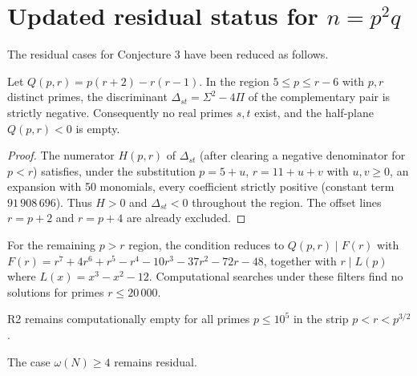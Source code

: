 
\section{Updated residual status for \( n = p^2 q \)}

The residual cases for Conjecture 3 have been reduced as follows.

\begin{theorem}
Let \( Q(p, r) = p(r + 2) - r(r - 1) \). In the region \( 5 \le p \le r - 6 \) with \( p, r \) distinct primes, the discriminant \( \Delta_{st} = \Sigma^2 - 4\Pi \) of the complementary pair is strictly negative. Consequently no real primes \( s, t \) exist, and the half-plane \( Q(p, r) < 0 \) is empty.
\end{theorem}

\begin{proof}
The numerator \( H(p, r) \) of \( \Delta_{st} \) (after clearing a negative denominator for \( p < r \)) satisfies, under the substitution \( p = 5 + u \), \( r = 11 + u + v \) with \( u, v \ge 0 \), an expansion with 50 monomials, every coefficient strictly positive (constant term \( 91\,908\,696 \)). Thus \( H > 0 \) and \( \Delta_{st} < 0 \) throughout the region. The offset lines \( r = p + 2 \) and \( r = p + 4 \) are already excluded.
\end{proof}

For the remaining \( p > r \) region, the condition reduces to \( Q(p, r) \mid F(r) \) with \( F(r) = r^7 + 4r^6 + r^5 - r^4 - 10r^3 - 37r^2 - 72r - 48 \), together with \( r \mid L(p) \) where \( L(x) = x^3 - x^2 - 12 \). Computational searches under these filters find no solutions for primes \( r \le 20\,000 \).

R2 remains computationally empty for all primes \( p \le 10^5 \) in the strip \( p < r < p^{3/2} \).

The case \( \omega(N) \ge 4 \) remains residual.
